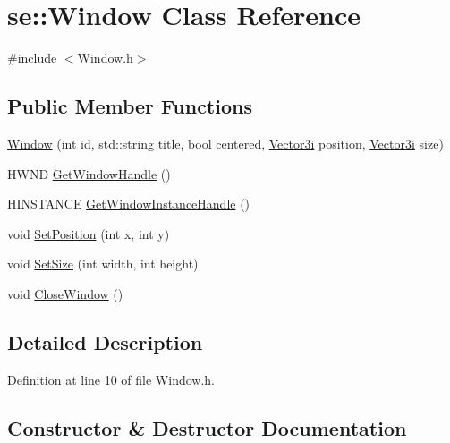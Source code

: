\hypertarget{classse_1_1_window}{}\section{se\+:\+:Window Class Reference}
\label{classse_1_1_window}


{\ttfamily \#include $<$Window.\+h$>$}

\subsection*{Public Member Functions}
\begin{DoxyCompactItemize}
\item 
\mbox{\hyperlink{classse_1_1_window_afbc248dc17b6a2b3f51f2a4381d2a463}{Window}} (int id, std\+::string title, bool centered, \mbox{\hyperlink{namespacese_ada11715de7cf6e87b5dfb4611fe68d29}{Vector3i}} position, \mbox{\hyperlink{namespacese_ada11715de7cf6e87b5dfb4611fe68d29}{Vector3i}} size)
\item 
H\+W\+ND \mbox{\hyperlink{classse_1_1_window_afa8b06b9831c41d9a38e375bfb133c9e}{Get\+Window\+Handle}} ()
\item 
H\+I\+N\+S\+T\+A\+N\+CE \mbox{\hyperlink{classse_1_1_window_a7ae4b774d8f47d6abb0462e2240e8cae}{Get\+Window\+Instance\+Handle}} ()
\item 
void \mbox{\hyperlink{classse_1_1_window_ad2fc9ceb2c543762bbc863fe6df637a1}{Set\+Position}} (int x, int y)
\item 
void \mbox{\hyperlink{classse_1_1_window_a7c66652dccf4764cfa6e4af6fab684b8}{Set\+Size}} (int width, int height)
\item 
void \mbox{\hyperlink{classse_1_1_window_a5d405fd0707124c8df9d4a628d7a33c7}{Close\+Window}} ()
\end{DoxyCompactItemize}


\subsection{Detailed Description}


Definition at line 10 of file Window.\+h.



\subsection{Constructor \& Destructor Documentation}
\mbox{\label{classse_1_1_window_afbc248dc17b6a2b3f51f2a4381d2a463}} 
